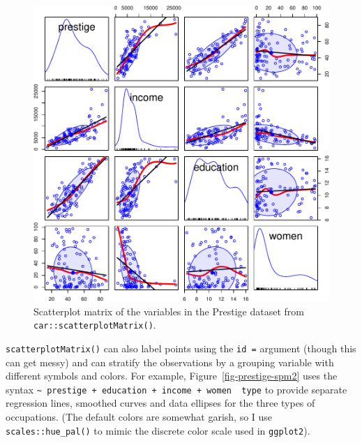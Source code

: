 \documentclass[
  letterpaper,
  10pt,
  krantz2]{krantz}
\begin{document}
\begin{figure}[H]

{\centering \includegraphics[width=1\textwidth,height=\textheight]{figs/ch03/fig-prestige-spm1-1.pdf}

}

\caption{\label{fig-prestige-spm1}Scatterplot matrix of the variables in
the Prestige dataset from \texttt{car::scatterplotMatrix()}.}

\end{figure}

\texttt{scatterplotMatrix()} can also label points using the
\texttt{id\ =} argument (though this can get messy) and can stratify the
observations by a grouping variable with different symbols and colors.
For example, Figure~\ref{fig-prestige-spm2} uses the syntax
\texttt{\textasciitilde{}\ prestige\ +\ education\ +\ income\ +\ women\ \textbar{}\ type}
to provide separate regression lines, smoothed curves and data ellipses
for the three types of occupations. (The default colors are somewhat
garish, so I use \texttt{scales::hue\_pal()} to mimic the discrete color
scale used in \texttt{ggplot2}).
\end{document}
